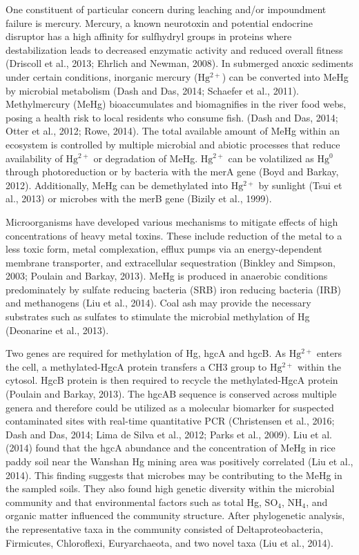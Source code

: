 \documentclass[ms]{uncgdissertationexp}
\theoremstyle{plain}
\theoremstyle{definition}
\theoremstyle{remark}
\begin{document}
  One constituent of particular concern during leaching and/or impoundment
  failure is mercury. Mercury, a known neurotoxin and potential endocrine
  disruptor has a high affinity for sulfhydryl groups in proteins where
  destabilization leads to decreased enzymatic activity and reduced
  overall fitness (Driscoll et al., 2013; Ehrlich and Newman, 2008). In
  submerged anoxic sediments under certain conditions, inorganic mercury
  (\(\mathrm{Hg^{2+}}\)) can be converted into MeHg by microbial
  metabolism (Dash and Das, 2014; Schaefer et al., 2011). Methylmercury
  (MeHg) bioaccumulates and biomagnifies in the river food webs, posing a
  health risk to local residents who consume fish. (Dash and Das, 2014;
  Otter et al., 2012; Rowe, 2014). The total available amount of MeHg
  within an ecosystem is controlled by multiple microbial and abiotic
  processes that reduce availability of \(\mathrm{Hg^{2+}}\) or
  degradation of MeHg. \(\mathrm{Hg^{2+}}\) can be volatilized as
  \(\mathrm{Hg^{0}}\) through photoreduction or by bacteria with the merA
  gene (Boyd and Barkay, 2012). Additionally, MeHg can be demethylated
  into \(\mathrm{Hg^{2+}}\) by sunlight (Tsui et al., 2013) or microbes
  with the merB gene (Bizily et al., 1999).
  
  Microorganisms have developed various mechanisms to mitigate effects of
  high concentrations of heavy metal toxins. These include reduction of
  the metal to a less toxic form, metal complexation, efflux pumps via an
  energy-dependent membrane transporter, and extracellular sequestration
  (Binkley and Simpson, 2003; Poulain and Barkay, 2013). MeHg is produced
  in anaerobic conditions predominately by sulfate reducing bacteria (SRB)
  iron reducing bacteria (IRB) and methanogens (Liu et al., 2014). Coal
  ash may provide the necessary substrates such as sulfates to stimulate
  the microbial methylation of Hg (Deonarine et al., 2013).
  
  Two genes are required for methylation of Hg, hgcA and hgcB. As
  \(\mathrm{Hg^{2+}}\) enters the cell, a methylated-HgcA protein
  transfers a CH3 group to \(\mathrm{Hg^{2+}}\) within the cytosol. HgcB
  protein is then required to recycle the methylated-HgcA protein (Poulain
  and Barkay, 2013). The hgcAB sequence is conserved across multiple
  genera and therefore could be utilized as a molecular biomarker for
  suspected contaminated sites with real-time quantitative PCR
  (Christensen et al., 2016; Dash and Das, 2014; Lima de Silva et al.,
  2012; Parks et al., 2009). Liu et al. (2014) found that the hgcA
  abundance and the concentration of MeHg in rice paddy soil near the
  Wanshan Hg mining area was positively correlated (Liu et al., 2014).
  This finding suggests that microbes may be contributing to the MeHg in
  the sampled soils. They also found high genetic diversity within the
  microbial community and that environmental factors such as total Hg,
  \(\mathrm{SO_4}\), \(\mathrm{NH_4}\), and organic matter influenced the
  community structure. After phylogenetic analysis, the representative
  taxa in the community consisted of Deltaproteobacteria, Firmicutes,
  Chloroflexi, Euryarchaeota, and two novel taxa (Liu et al., 2014).
  
\end{document}
